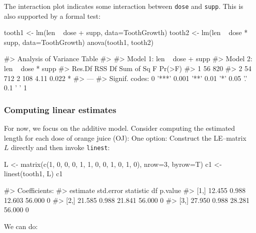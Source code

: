 The interaction plot indicates some interaction between \texttt{dose}
and \texttt{supp}. This is also supported by a formal test:

\begin{Schunk}
\begin{Sinput}
tooth1 <- lm(len ~ dose + supp, data=ToothGrowth)
tooth2 <- lm(len ~ dose * supp, data=ToothGrowth)
anova(tooth1, tooth2)
\end{Sinput}
\begin{Soutput}
#> Analysis of Variance Table
#> 
#> Model 1: len ~ dose + supp
#> Model 2: len ~ dose * supp
#>   Res.Df RSS Df Sum of Sq    F Pr(>F)  
#> 1     56 820                           
#> 2     54 712  2       108 4.11  0.022 *
#> ---
#> Signif. codes:  0 '***' 0.001 '**' 0.01 '*' 0.05 '.' 0.1 ' ' 1
\end{Soutput}
\end{Schunk}

\hypertarget{computing-linear-estimates}{%
\subsubsection{Computing linear
estimates}\label{computing-linear-estimates}}

For now, we focus on the additive model. Consider computing the
estimated length for each dose of orange juice (OJ): One option:
Construct the LE--matrix \(L\) directly and then invoke \texttt{linest}:

\begin{Schunk}
\begin{Sinput}
L <- matrix(c(1, 0, 0, 0, 
              1, 1, 0, 0,
              1, 0, 1, 0), nrow=3, byrow=T)
c1 <- linest(tooth1, L)
c1
\end{Sinput}
\begin{Soutput}
#> Coefficients:
#>      estimate std.error statistic     df p.value
#> [1,]   12.455     0.988    12.603 56.000       0
#> [2,]   21.585     0.988    21.841 56.000       0
#> [3,]   27.950     0.988    28.281 56.000       0
\end{Soutput}
\end{Schunk}

We can do:


